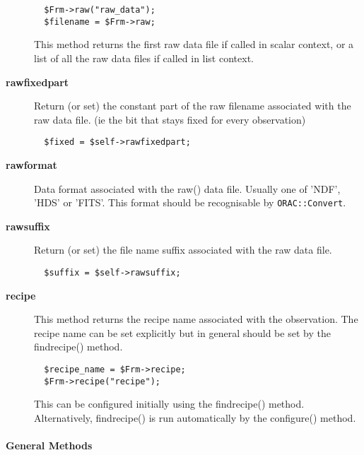 \begin{description}
\begin{verbatim}
  $Frm->raw("raw_data");
  $filename = $Frm->raw;
\end{verbatim}


This method returns the first raw data file if called in scalar
context, or a list of all the raw data files if called in list
context.


\item[\textbf{rawfixedpart}] \mbox{}

Return (or set) the constant part of the raw filename associated
with the raw data file. (ie the bit that stays fixed for every 
observation)

\begin{verbatim}
  $fixed = $self->rawfixedpart;
\end{verbatim}

\item[\textbf{rawformat}] \mbox{}

Data format associated with the raw() data file.
Usually one of 'NDF', 'HDS' or 'FITS'. This format should be
recognisable by \texttt{ORAC::Convert}.


\item[\textbf{rawsuffix}] \mbox{}

Return (or set) the file name suffix associated with
the raw data file.

\begin{verbatim}
  $suffix = $self->rawsuffix;
\end{verbatim}

\item[\textbf{recipe}] \mbox{}

This method returns the recipe name associated with the observation.
The recipe name can be set explicitly but in general should be
set by the findrecipe() method.

\begin{verbatim}
  $recipe_name = $Frm->recipe;
  $Frm->recipe("recipe");
\end{verbatim}


This can be configured initially using the findrecipe() method.
Alternatively, findrecipe() is run automatically by the configure()
method.

\end{description}
\paragraph*{General Methods\label{ORAC::Frame_General_Methods}}



